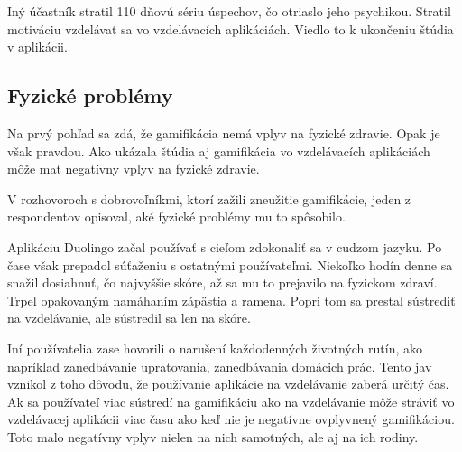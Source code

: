 \documentclass[10pt,twoside,slovak,a4paper]{article}
\begin{document}
Iný účastník stratil 110 dňovú sériu úspechov, čo otriaslo jeho psychikou. Stratil motiváciu vzdelávať sa vo vzdelávacích aplikáciách. Viedlo to k ukončeniu štúdia v aplikácii.\cite{HadiMogavi2022}




%
%
%


\subsection{Fyzické problémy} \label{Vplyv:Fyzické problémy}

Na prvý pohľad sa zdá, že gamifikácia nemá vplyv na fyzické zdravie. Opak je však pravdou. Ako ukázala štúdia\cite{HadiMogavi2022} aj gamifikácia vo vzdelávacích aplikáciách môže mať negatívny vplyv na fyzické zdravie.

V rozhovoroch\cite{HadiMogavi2022} s dobrovoľníkmi, ktorí zažili zneužitie gamifikácie, jeden z respondentov opisoval, aké fyzické problémy mu to spôsobilo. 

Aplikáciu Duolingo začal používať s cieľom zdokonaliť sa v cudzom jazyku. Po čase však prepadol súťaženiu s ostatnými používateľmi. Niekoľko hodín denne sa snažil dosiahnuť, čo najvyššie skóre, až sa mu to prejavilo na fyzickom zdraví. Trpel opakovaným namáhaním zápästia a ramena. Popri tom sa prestal sústrediť na vzdelávanie, ale sústredil sa len na skóre. 

Iní používatelia zase hovorili o narušení každodenných životných rutín, ako napríklad zanedbávanie upratovania, zanedbávania domácich prác. Tento jav vznikol z toho dôvodu, že používanie aplikácie na vzdelávanie zaberá určitý čas. Ak sa používateľ viac sústredí na gamifikáciu ako na vzdelávanie môže stráviť vo vzdelávacej aplikácii viac času ako keď nie je negatívne ovplyvnený gamifikáciou. Toto malo negatívny vplyv nielen na nich samotných, ale aj na ich rodiny\cite{HadiMogavi2022}.
\end{document}
